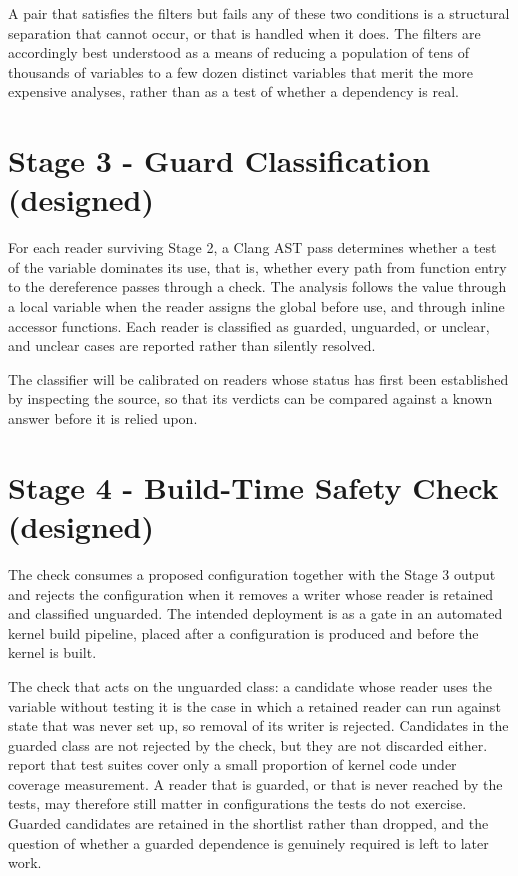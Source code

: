 \documentclass[12pt, a4paper, oneside]{book}
\begin{document}
A pair that satisfies the filters but fails any of these two conditions is a
structural separation that cannot occur, or that is handled when it does. The
filters are accordingly best understood as a means of reducing a population of
tens of thousands of variables to a few dozen distinct variables that merit the more expensive
analyses, rather than as a test of whether a dependency is real.

\section{Stage 3 - Guard Classification (designed)}

For each reader surviving Stage 2, a Clang AST pass determines whether a test of
the variable dominates its use, that is, whether every path from function entry
to the dereference passes through a check. The analysis follows the value through
a local variable when the reader assigns the global before use, and through
inline accessor functions. Each reader is classified as guarded, unguarded, or
unclear, and unclear cases are reported rather than silently resolved.

The classifier will be calibrated on readers whose status has first been
established by inspecting the source, so that its verdicts can be compared
against a known answer before it is relied upon.

\section{Stage 4 - Build-Time Safety Check (designed)}

The check consumes a proposed configuration together with the Stage 3 output and
rejects the configuration when it removes a writer whose reader is retained and
classified unguarded. The intended deployment is as a gate in an automated kernel
build pipeline, placed after a configuration is produced and before the kernel is
built.

The check that acts on the unguarded class: a candidate whose reader uses the variable
without testing it is the case in which a retained reader can run against state
that was never set up, so removal of its writer is rejected. Candidates in the
guarded class are not rejected by the check, but they are not discarded either.
\citet{kuo2020cozart} report that test suites cover only a small proportion of
kernel code under coverage measurement. A reader that is guarded, or that is never
reached by the tests, may therefore still matter in configurations the tests do
not exercise. Guarded candidates are retained in the shortlist rather than
dropped, and the question of whether a guarded dependence is genuinely required is
left to later work.
\end{document}
